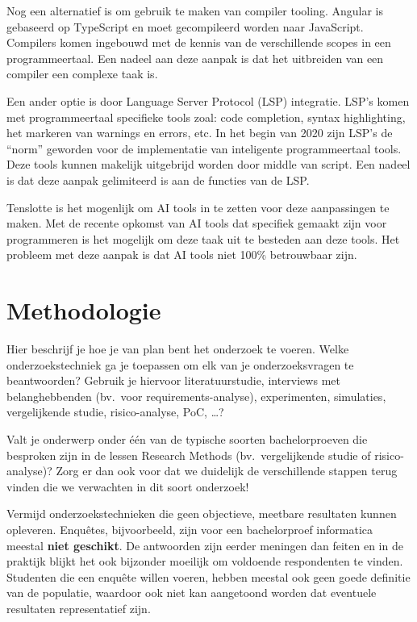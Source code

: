 Nog een alternatief is om gebruik te maken van compiler tooling.
Angular is gebaseerd op TypeScript en moet gecompileerd worden naar JavaScript.
Compilers komen ingebouwd met de kennis van de verschillende scopes in een programmeertaal.
Een nadeel aan deze aanpak is dat het uitbreiden van een compiler een complexe taak is.

Een ander optie is door Language Server Protocol (LSP) integratie.
LSP's komen met programmeertaal specifieke tools zoal: code completion, syntax highlighting, het markeren van warnings en errors, etc.
In het begin van 2020 zijn LSP's de ``norm'' geworden voor de implementatie van inteligente programmeertaal tools.
Deze tools kunnen makelijk uitgebrijd worden door middle van script.
Een nadeel is dat deze aanpak gelimiteerd is aan de functies van de LSP.

Tenslotte is het mogenlijk om AI tools in te zetten voor deze aanpassingen te maken.
Met de recente opkomst van AI tools dat specifiek gemaakt zijn voor programmeren is het mogelijk om deze taak uit te besteden aan deze tools.
Het probleem met deze aanpak is dat AI tools niet 100\% betrouwbaar zijn.

\section{Methodologie}
\label{sec:methodologie}

Hier beschrijf je hoe je van plan bent het onderzoek te voeren. Welke onderzoekstechniek ga je toepassen om elk van je onderzoeksvragen te beantwoorden? Gebruik je hiervoor literatuurstudie, interviews met belanghebbenden (bv.~voor requirements-analyse), experimenten, simulaties, vergelijkende studie, risico-analyse, PoC, \ldots?

Valt je onderwerp onder één van de typische soorten bachelorproeven die besproken zijn in de lessen Research Methods (bv.\ vergelijkende studie of risico-analyse)? Zorg er dan ook voor dat we duidelijk de verschillende stappen terug vinden die we verwachten in dit soort onderzoek!

Vermijd onderzoekstechnieken die geen objectieve, meetbare resultaten kunnen opleveren. Enquêtes, bijvoorbeeld, zijn voor een bachelorproef informatica meestal \textbf{niet geschikt}. De antwoorden zijn eerder meningen dan feiten en in de praktijk blijkt het ook bijzonder moeilijk om voldoende respondenten te vinden. Studenten die een enquête willen voeren, hebben meestal ook geen goede definitie van de populatie, waardoor ook niet kan aangetoond worden dat eventuele resultaten representatief zijn.

